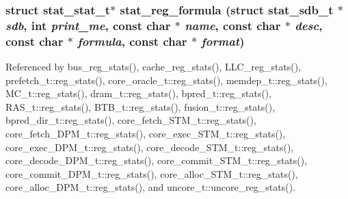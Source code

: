 \subsubsection[{stat\_\-reg\_\-formula}]{\setlength{\rightskip}{0pt plus 5cm}struct {\bf stat\_\-stat\_\-t}$\ast$ stat\_\-reg\_\-formula (struct {\bf stat\_\-sdb\_\-t} $\ast$ {\em sdb}, \/  int {\em print\_\-me}, \/  const char $\ast$ {\em name}, \/  const char $\ast$ {\em desc}, \/  const char $\ast$ {\em formula}, \/  const char $\ast$ {\em format})\hspace{0.3cm}{\tt  [read]}}\label{zesto_2stats_8h_f2f491659903b1b21de69fe6c767a64a}




Referenced by bus\_\-reg\_\-stats(), cache\_\-reg\_\-stats(), LLC\_\-reg\_\-stats(), prefetch\_\-t::reg\_\-stats(), core\_\-oracle\_\-t::reg\_\-stats(), memdep\_\-t::reg\_\-stats(), MC\_\-t::reg\_\-stats(), dram\_\-t::reg\_\-stats(), bpred\_\-t::reg\_\-stats(), RAS\_\-t::reg\_\-stats(), BTB\_\-t::reg\_\-stats(), fusion\_\-t::reg\_\-stats(), bpred\_\-dir\_\-t::reg\_\-stats(), core\_\-fetch\_\-STM\_\-t::reg\_\-stats(), core\_\-fetch\_\-DPM\_\-t::reg\_\-stats(), core\_\-exec\_\-STM\_\-t::reg\_\-stats(), core\_\-exec\_\-DPM\_\-t::reg\_\-stats(), core\_\-decode\_\-STM\_\-t::reg\_\-stats(), core\_\-decode\_\-DPM\_\-t::reg\_\-stats(), core\_\-commit\_\-STM\_\-t::reg\_\-stats(), core\_\-commit\_\-DPM\_\-t::reg\_\-stats(), core\_\-alloc\_\-STM\_\-t::reg\_\-stats(), core\_\-alloc\_\-DPM\_\-t::reg\_\-stats(), and uncore\_\-t::uncore\_\-reg\_\-stats().


